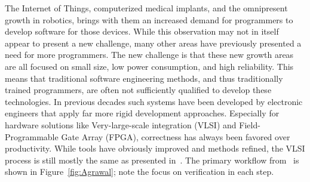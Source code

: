 The Internet of Things, computerized medical implants, and the omnipresent growth in robotics, brings with them an increased demand for programmers to develop software for those devices. While this observation may not in itself appear to present a new challenge, many other areas have previously presented a need for more programmers. The new challenge is that these new growth areas are all focused on small size, low power consumption, and high reliability. This means that traditional software engineering methods, and thus traditionally trained programmers, are often not sufficiently qualified to develop these technologies.
In previous decades such systems have been developed by electronic engineers that apply far more rigid development approaches. Especially for hardware solutions like Very-large-scale integration (VLSI) and Field-Programmable Gate Array (FPGA), correctness has always been favored over productivity.
While tools have obviously improved and methods refined, the VLSI process is still mostly the same as presented in~\cite{Agrawal:1985:VDP:320599.322570}. The primary workflow from~\cite{Agrawal:1985:VDP:320599.322570} is shown in Figure~\ref{fig:Agrawal}; note the focus on verification in each step.

